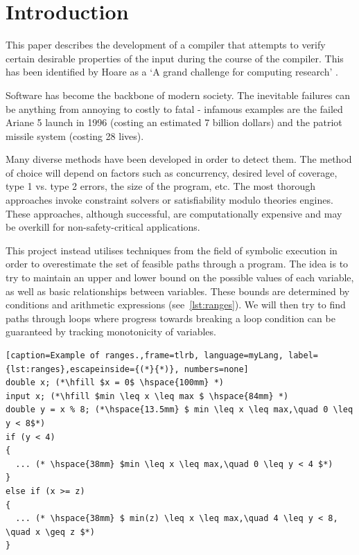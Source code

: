 \documentclass[12pt,a4paper]{article}
\begin{document}
\section{Introduction}
This paper describes the development of a compiler that attempts to verify certain desirable properties of the input during the course of the compiler.
This has been identified by Hoare as a `A grand challenge for computing research' \citep{hoare}.

Software has become the backbone of modern society.
The inevitable failures can be anything from annoying to costly to fatal - infamous examples are the failed Ariane 5 launch in 1996
(costing an estimated 7 billion dollars) and the patriot missile system (costing 28 lives).

Many diverse methods have been developed in order to detect them. The method of choice will depend on factors such as concurrency,
desired level of coverage, type 1 vs. type 2 errors, the size of the program, etc. The most thorough approaches invoke constraint solvers or satisfiability modulo theories engines. These approaches, although successful, are computationally expensive and may be overkill for non-safety-critical applications.

This project instead utilises techniques from the field of symbolic execution in order to overestimate the set of feasible paths through a program.
The idea is to try to maintain an upper and lower bound on the possible values of each variable, as well as basic relationships between variables.
These bounds are determined by conditions and arithmetic expressions (see~\cref{lst:ranges}).
We will then try to find paths through loops where progress towards breaking a loop condition can be guaranteed by tracking monotonicity of variables.

\begin{minipage}{\linewidth}
\begin{lstlisting}[caption=Example of ranges.,frame=tlrb, language=myLang, label={lst:ranges},escapeinside={(*}{*)}, numbers=none]
double x; (*\hfill $x = 0$ \hspace{100mm} *)
input x; (*\hfill $min \leq x \leq max $ \hspace{84mm} *)
double y = x % 8; (*\hspace{13.5mm} $ min \leq x \leq max,\quad 0 \leq y < 8$*)
if (y < 4)
{
  ... (* \hspace{38mm} $min \leq x \leq max,\quad 0 \leq y < 4 $*)
}
else if (x >= z)
{
  ... (* \hspace{38mm} $ min(z) \leq x \leq max,\quad 4 \leq y < 8, \quad x \geq z $*) 
}
\end{lstlisting}
\end{minipage}
\end{document}
